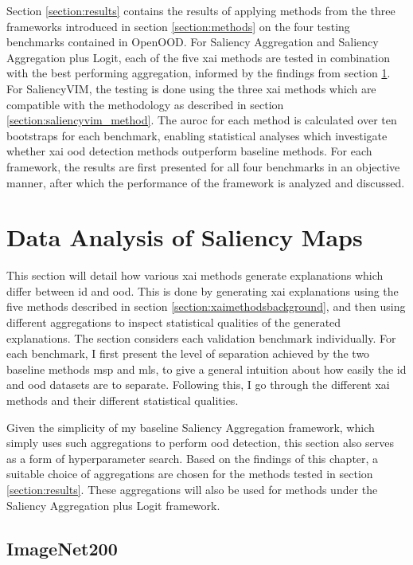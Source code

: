 \documentclass[UKenglish]{uiomasterthesis} %
\theoremstyle{definition}
\begin{document}
Section \ref{section:results} contains the results of applying methods from the three frameworks introduced in section \ref{section:methods} on the four testing benchmarks contained in OpenOOD. For Saliency Aggregation and Saliency Aggregation plus Logit, each of the five \ac{xai} methods are tested in combination with the best performing aggregation, informed by the findings from section \ref{section:saliencyagg}. For SaliencyVIM, the testing is done using the three \ac{xai} methods which are compatible with the methodology as described in section \ref{section:saliencyvim_method}. The \ac{auroc} for each method is calculated over ten bootstraps for each benchmark, enabling statistical analyses which investigate whether \ac{xai} \ac{ood} detection methods outperform baseline methods. For each framework, the results are first presented for all four benchmarks in an objective manner, after which the performance of the framework is analyzed and discussed.

\section{Data Analysis of Saliency Maps} \label{section:saliencyagg}

This section will detail how various \ac{xai} methods generate explanations which differ between \ac{id} and \ac{ood}. This is done by generating \ac{xai} explanations using the five methods described in section \ref{section:xaimethodsbackground}, and then using different aggregations to inspect statistical qualities of the generated explanations. The section considers each validation benchmark individually. For each benchmark, I first present the level of separation achieved by the two baseline methods \ac{msp} and \ac{mls}, to give a general intuition about how easily the \ac{id} and \ac{ood} datasets are to separate. Following this, I go through the different \ac{xai} methods and their different statistical qualities.

Given the simplicity of my baseline Saliency Aggregation framework, which simply uses such aggregations to perform \ac{ood} detection, this section also serves as a form of hyperparameter search. Based on the findings of this chapter, a suitable choice of aggregations are chosen for the methods tested in section \ref{section:results}. These aggregations will also be used for methods under the Saliency Aggregation plus Logit framework.

\subsection{ImageNet200}
\end{document}
